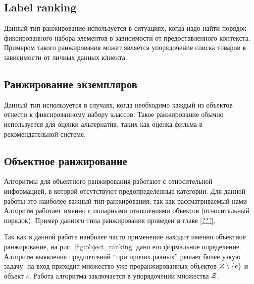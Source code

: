 	\subsection{Label ranking}
		Данный тип ранжирование используется в ситуациях, когда надо найти порядок фиксированного набора элементов в зависимости от предоставленного контекста. Примером такого ранжирования может является упорядочение списка товаров в зависимости от личных данных клиента.
	
	\subsection{Ранжирование экземпляров}
		Данный тип используется в случаях, когда необходимо каждый из объектов отнести к фиксированному набору классов. Такое ранжирование обычно используется для оценки альтернатив, таких как оценка фильма в рекомендательной системе.
	
	\subsection{Объектное ранжирование}
		Алгоритмы для объектного ранжирования работают с 
		относительной %
		информацией, в которой отсутствуют предопределенные категории. Для данной работы это наиболее важный тип ранжирования, так как рассматриваемый нами Алгоритм работает именно с попарными отношениями объектов (относительный порядок). Пример данного типа ранжирования приведен в главе \ref{???}.
		
		Так как в данной работе наиболее часто применение находит именно объектное ранжирование, на рис. \ref{fig:object_ranking} дано его формальное определение. Алгоритм выявления предпочтений \enquote{при прочих равных} решает более узкую задачу: на вход приходит множество уже проранжированных объектов $\mathcal{Z} \setminus \{e\}$ и объект $e$. Работа алгоритма заключается в упорядочении множества $\mathcal{Z}$.
		
